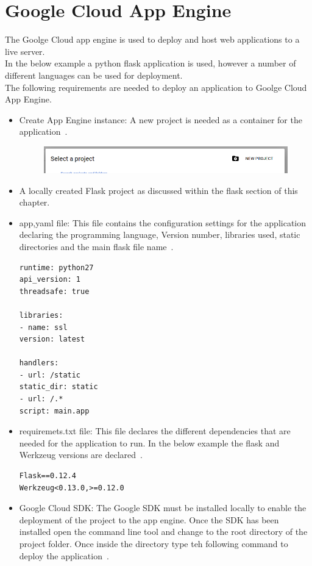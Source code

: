 \section{Google Cloud App Engine}
The Goolge Cloud app engine is used to deploy and host web applications to a live server.\\
In the below example a python flask application is used, however a number of different languages can be used for deployment.\\
The following requirements are needed to deploy an application to Goolge Cloud App Engine.
\begin{itemize}
	\item Create App Engine instance:
	A new project is needed as a container for the application~\cite{CreatingAppEngine:online}.
	\begin{figure}[H]
		\centering
		\includegraphics[width=0.7\linewidth]{img/GoogleNEwPRoject}
		\caption{}
		\label{fig:googlenewproject}
	\end{figure}
	
	\item A locally created Flask project as discussed within the flask section of this chapter.
	\item app,yaml file:
	This file contains the configuration settings for the application declaring the programming language, Version number, libraries used, static directories and the main flask file name~\cite{FlaskAppGoolge:online}.
\begin{verbatim}
runtime: python27
api_version: 1
threadsafe: true

libraries:
- name: ssl
version: latest

handlers:
- url: /static
static_dir: static
- url: /.*
script: main.app
\end{verbatim}
	\item requiremets.txt file:
	This file declares the different dependencies that are needed for the application to run.
	In the below example the flask and Werkzeug versions are declared~\cite{FlaskAppGoolge:online}.
\begin{verbatim}
Flask==0.12.4
Werkzeug<0.13.0,>=0.12.0
\end{verbatim}
	\item Google Cloud SDK:
	The Google SDK must be installed locally to enable the deployment of the project to the app engine. Once the SDK has been installed open the command line tool and change to the root directory of the project folder. Once inside the directory type teh following command to deploy the application~\cite{FlaskAppGoolge:online}.
\end{itemize}

